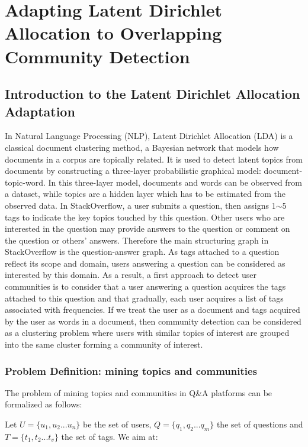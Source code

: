 \chapter{Adapting Latent Dirichlet Allocation to Overlapping Community Detection}
\doublespacing
\label{chap:lda}
\minitoc

\section{Introduction to the Latent Dirichlet Allocation Adaptation}
In Natural Language Processing (NLP), Latent Dirichlet Allocation (LDA) \cite{blei2003latent} is a classical document clustering method, a Bayesian network that models how documents in a corpus are topically related.
It is used to detect latent topics from documents by constructing a three-layer probabilistic graphical model: document-topic-word. In this three-layer model, documents and words can be observed from a dataset, while topics are a hidden layer which has to be estimated from the observed data.  
In StackOverflow, a user submits a question, then assigns 1$\sim$5 tags to indicate the key topics touched by this question. Other users who are interested in the question may provide answers to the question or comment on the question or others' answers. Therefore the main structuring graph in StackOverflow is the question-answer graph. As tags attached to a question  reflect its scope and domain, users answering a question can be considered as interested by this domain. As a result, a first approach to detect user communities is to consider that a user answering a question acquires the tags attached to this question and that gradually, each user acquires a list of tags associated with frequencies. If we treat the user as a document and tags acquired by the user as words in a document, then community detection can be considered as a clustering problem where users with similar topics of interest are grouped into the same cluster forming a community of interest.


\subsection{Problem Definition: mining topics and communities}

The problem of mining topics and communities in Q\&A platforms can be formalized as follows:

Let $U=\{u_1,u_2...u_n\}$ be the set of users, $Q=\{q_1,q_2...q_m\}$ the set of questions and $T=\{t_1,t_2...t_v\}$ the set of tags. We aim at:

